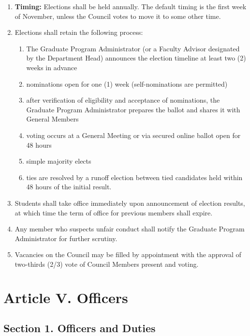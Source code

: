 \documentclass[11pt]{article}
\newcommand{\Article}[2]{\section*{Article #1. #2}}
\newcommand{\Sec}[1]{\subsection*{Section {#1}}}
\begin{document}
\begin{enumerate}[label=\alph*)]
    \item \textbf{Timing:} Elections shall be held annually. The default timing is the first week of November, unless the Council votes to move it to some other time.
    \item Elections shall retain the following process:
    \begin{enumerate}[label=\roman*.]
        \item The Graduate Program Administrator (or a Faculty Advisor designated by the Department Head) announces the election timeline at least two (2) weeks in advance
        \item nominations open for one (1) week (self-nominations are permitted)
        \item after verification of eligibility and acceptance of nominations, the Graduate Program Administrator prepares the ballot and shares it with General Members
        \item voting occurs at a General Meeting or via secured online ballot open for 48 hours
        \item simple majority elects
        \item ties are resolved by a runoff election between tied candidates held within 48 hours of the initial result.
    \end{enumerate}
    \item Students shall take office immediately upon announcement of election results, at which time the term of office for previous members shall expire.
    \item Any member who suspects unfair conduct shall notify the Graduate Program Administrator for further scrutiny.
    \item Vacancies on the Council may be filled by appointment with the approval of two-thirds (2/3) vote of Council Members present and voting.
\end{enumerate}

\Article{V}{Officers}

\Sec{1. Officers and Duties}
\end{document}
